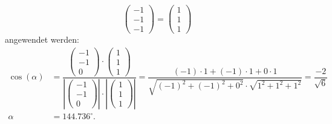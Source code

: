 \begin{loesung}
\begin{teilaufgaben}
\[\begin{pmatrix}-1\\-1\\-1\end{pmatrix}
= 
\begin{pmatrix} 1\\ 1\\ 1\end{pmatrix}
\]
angewendet werden:
\begin{align*}
\cos(\alpha)&= \dfrac{\begin{pmatrix} -1\\ -1\\ 0\end{pmatrix}\cdot 
\begin{pmatrix} 1\\ 1\\ 1\end{pmatrix}}
{\left|\begin{pmatrix} -1\\ -1\\ 0\end{pmatrix}\right|\cdot \left|\begin{pmatrix} 1\\ 1\\ 1\end{pmatrix}\right|} 
= \dfrac{(-1)\cdot 1 + (-1)\cdot 1 + 0 \cdot 1}{\sqrt{(-1)^2+(-1)^2+0^2}\cdot \sqrt{1^2+1^2+1^2}} = \dfrac{-2}{\sqrt{6}}\\
\alpha&=144.736^\circ.
\end{align*}
\qedhere
\end{teilaufgaben}
\end{loesung}


